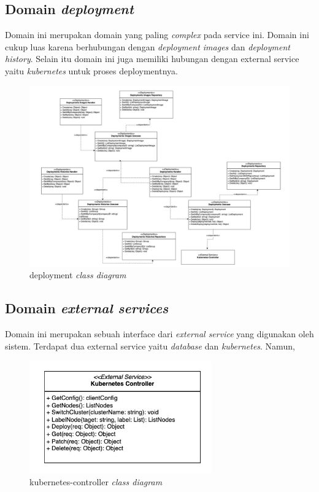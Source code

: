 \pagebreak

\subsection{Domain \textit{deployment}}

Domain ini merupakan domain yang paling \textit{complex} pada service ini. Domain ini cukup luas karena berhubungan dengan \textit{deployment images} dan \textit{deployment history}. Selain itu domain ini juga memiliki hubungan dengan external service yaitu \textit{kubernetes} untuk proses deploymentnya.

\begin{figure}[h]
  \centering
  \includegraphics[width=1\textwidth]{resources/chapter-3/class/deployment-class-diagram.jpg}
  \caption{deployment \textit{class diagram}}
  \label{fig:deployment-class-diagram}
\end{figure}

\subsection{Domain \textit{external services}}

Domain ini merupakan sebuah interface dari \textit{external service} yang digunakan oleh sistem. Terdapat dua external service yaitu \textit{database} dan \textit{kubernetes}. Namun,

\begin{figure}[h]
  \centering
  \includegraphics[width=0.7\textwidth]{resources/chapter-3/class/kubernetes-controller}
  \caption{kubernetes-controller \textit{class diagram}}
  \label{fig:kubernetes-controller-class-diagram}
\end{figure}